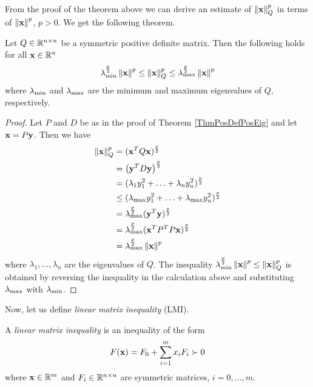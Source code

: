 \documentclass[a4paper,12pt,twoside,BCOR=10mm]{scrbook}
\begin{document}
From the proof of the theorem above we can derive an estimate of $\left\lVert\mathbf{x}\right\rVert_Q^p$ in terms of $\left\lVert\mathbf{x}\right\rVert_{}^{p}$, $p > 0$. We get the following theorem.

\begin{theorem}\label{Thm pnmorm norm relation}
Let $Q\in \mathbb{R}^{n\times n}$ be a symmetric positive definite matrix. Then the following holds for all $\mathbf{x} \in \mathbb{R}^{n}$
\begin{align*}
   \lambda_{\min}^\frac{p}{2} \left\lVert\mathbf{x}\right\rVert^p \leq \left\lVert\mathbf{x}\right\rVert_Q^p \leq \lambda_{\max}^\frac{p}{2} \left\lVert\mathbf{x}\right\rVert^p
\end{align*}
where $\lambda_{\min}$ and $\lambda_{\max}$ are the minimum and maximum eigenvalues of $Q$, respectively.
\end{theorem}
\begin{proof}
Let $P$ and $D$ be as in the proof of Theorem \ref{ThmPosDefPosEig} and let $\mathbf{x} = P\mathbf{y}$. Then we have
\begin{align*}
    \left\lVert\mathbf{x}\right\rVert_Q^p &= (\mathbf{x}^T Q \mathbf{x})^\frac{p}{2}\\
    &= \left (\mathbf{y}^T D \mathbf{y} \right)^\frac{p}{2}\\
    &= (\lambda_1 y_1^2 + \ldots + \lambda_n y_n^2)^\frac{p}{2}\\
    &\leq (\lambda_{\max} y_1^2 + \ldots + \lambda_{\max} y_n^2)^\frac{p}{2}\\
    &= \lambda_{\max}^\frac{p}{2} (\mathbf{y}^T \mathbf{y})^\frac{p}{2}\\
    &= \lambda_{\max}^\frac{p}{2} (\mathbf{x}^T P^TP\mathbf{x})^\frac{p}{2}\\
    &= \lambda_{\max}^\frac{p}{2} \left\lVert\mathbf{x}\right\rVert^p
\end{align*}
where $\lambda_1, \ldots, \lambda_n$ are the eigenvalues of $Q$. The inequality $\lambda_{\min}^\frac{p}{2}\left\lVert\mathbf{x}\right\rVert^p \leq \left\lVert\mathbf{x}\right\rVert_Q^p$ is obtained by reversing the inequality in the calculation above and substituting $\lambda_{\max}$ with $\lambda_{\min}$.
\end{proof}
\fi

Now, let us define \textit{linear matrix inequality} (LMI).

\begin{definition}\label{LMIdef}
A \textit{linear matrix inequality} is an inequality of the form
\begin{align}\label{LMI}
    F(\mathbf{x}) = F_0 + \sum\limits_{i=1}^m x_iF_i \succ 0
\end{align}
where $\mathbf{x}\in\mathbb{R}^{m}$ and $F_i \in \mathbb{R}^{n\times n}$ are symmetric matrices, $i = 0,\ldots, m$.
\end{definition}
\end{document}
